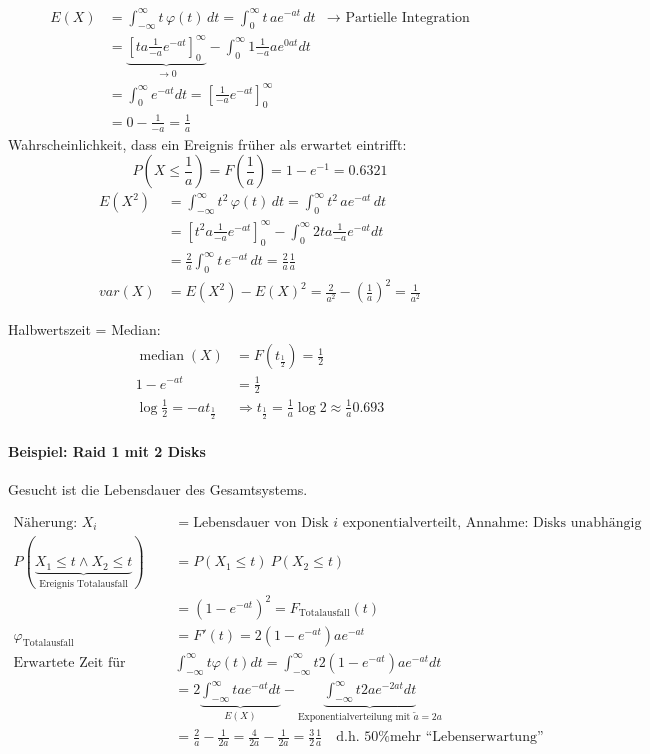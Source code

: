 \documentclass[10pt,a4paper]{scrartcl}
\newif\ifincludeExamples
\DeclareMathOperator{\median}{median}
\begin{document}
\begin{align*}
E(X) & = \int_{-\infty}^\infty t\,\varphi(t)\,dt = \int_0^\infty t\,ae^{-at}\,dt & \rightarrow \text{ Partielle Integration} \\
     & = \underbrace{\left[ ta\frac{1}{-a}e^{-at}\right]_0^\infty}_{\to 0} - \int_0^\infty 1\frac{1}{-a}ae^{0at}dt \\
     & = \int_0^\infty e^{-at} dt = \left[ \frac{1}{-a}e^{-at}\right]_0^\infty \\
     & = 0 - \frac{1}{-a} = \frac{1}{a}
\end{align*}
Wahrscheinlichkeit, dass ein Ereignis früher als erwartet eintrifft:
$$ P\left(X\le\frac{1}{a}\right) = F\left(\frac{1}{a}\right) = 1-e^{-1} = 0.6321 $$
\begin{align*}
E(X^2) & = \int_{-\infty}^\infty t^2\,\varphi(t)\,dt = \int_0^\infty t^2\,ae^{-at}\,dt \\
       & = \left[t^2 a\frac{1}{-a}e^{-at}\right]_0^\infty - \int_0^\infty 2t a\frac{1}{-a}e^{-at} dt \\
       & = \frac{2}{a}\int_0^\infty t\,e^{-at}\,dt = \frac{2}{a}\frac{1}{a} \\
var(X) & = E(X^2) - E(X)^2 = \frac{2}{a^2} - \left(\frac{1}{a}\right)^2 = \frac{1}{a^2}
\end{align*}

Halbwertszeit = Median:
\begin{align*}
\median(X) & = F(t_{\frac{1}{2}}) = \frac{1}{2} \\
1-e^{-at} & = \frac{1}{2} \\
\log \frac{1}{2} = -at_{\frac{1}{2}} &\Rightarrow t_{\frac{1}{2}} = \frac{1}{a} \log 2 \approx \frac{1}{a} 0.693
\end{align*}
\fi
\ifincludeExamples
\paragraph{Beispiel: Raid 1 mit 2 Disks}
Gesucht ist die Lebensdauer des Gesamtsystems.

\begin{align*}
\text{Näherung: } X_i & = \text{Lebensdauer von Disk } i \text{ exponentialverteilt, Annahme: Disks unabhängig}\\
P(\underbrace{X_1 \le t \wedge X_2 \le t}_{\text{Ereignis Totalausfall}}) & = P(X_1 \le t)\ P(X_2 \le t) \\
  & = (1-e^{-at})^2 = F_{\text{Totalausfall}}(t) \\
\varphi_{\text{Totalausfall}} & = F'(t) = 2(1-e^{-at})ae^{-at} \\
\text{Erwartete Zeit für Totalausfall: }& \int_{-\infty}^\infty t\varphi(t)dt = \int_{-\infty}^\infty t 2(1-e^{-at})ae^{-at} dt \\
 & = 2 \underbrace{\int_{-\infty}^\infty t ae^{-at} dt}_{E(X)} - \underbrace{\int_{-\infty}^\infty t 2ae^{-2at} dt}_{\text{Exponentialverteilung mit }\tilde{a} = 2a} \\
 & = \frac{2}{a} - \frac{1}{2a} = \frac{4}{2a} - \frac{1}{2a} = \frac{3}{2} \frac{1}{a} \quad \text{d.h. 50\% mehr ``Lebenserwartung''}
\end{align*}
\end{document}

